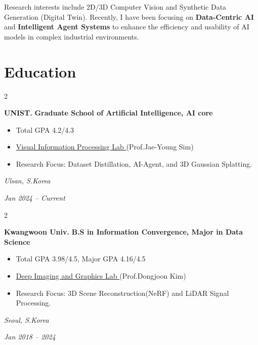 \documentclass[10pt, letterpaper]{article}
\newenvironment{highlights}{
    \begin{itemize}[
        topsep=0.10 cm,
        parsep=0.10 cm,
        partopsep=0pt,
        itemsep=0pt,
        leftmargin=0.4 cm + 10pt
    ]
}{
    \end{itemize}
} %
\newenvironment{twocolentry}[2][]{
    \onecolentry
    \def\secondColumn{#2}
    \setcolumnwidth{\fill, 3.5 cm}
    \begin{paracol}{2}
}{
    \switchcolumn \raggedleft \secondColumn
    \end{paracol}
    \endonecolentry
} %
\let\hrefWithoutArrow\href
\renewcommand{\href}[2]{\hrefWithoutArrow{#1}{\ifthenelse{\equal{#2}{}}{ }{#2 }\raisebox{.15ex}{\footnotesize \faExternalLink*}}}
\begin{document}
    Research interests include 2D/3D Computer Vision and Synthetic Data Generation (Digital Twin). Recently, I have been focusing on \textbf{Data-Centric AI} and \textbf{Intelligent Agent Systems} to enhance the efficiency and usability of AI models in complex industrial environments.
    
    \vspace{0.2cm}


    \section{Education}
        \begin{twocolentry}{
            \small\textit{Ulsan, S.Korea}
            
            \vspace{0.2cm}
            
            \textit{Jan 2024 – Current}
        }
            \textbf{\color{headingOrange}UNIST.}
            \textbf{Graduate School of Artificial Intelligence, AI core}
            \begin{highlights}
                \item Total GPA 4.2/4.3
                \item \hrefWithoutArrow{https://vip.unist.ac.kr/}{Visual Information Processing Lab \faLink}
                (Prof.Jae-Young Sim)
                \item Research Focus: Dataset Distillation, AI-Agent, and 3D Gaussian Splatting.
                \end{highlights}
        \end{twocolentry}


        \begin{twocolentry}{
            \small\textit{Seoul, S.Korea}
            
            \vspace{0.2cm}
            
            \textit{Jan 2018 – 2024}
        }
            \textbf{\color{headingOrange}Kwangwoon Univ.}
            \textbf{B.S in Information Convergence, Major in Data Science}
            \begin{highlights}
                \item Total GPA 3.98/4.5, Major GPA 4.16/4.5
                \item \hrefWithoutArrow{https://korfriend.github.io/}{Deep Imaging and Graphics Lab \faLink}(Prof.Dongjoon Kim)
                \item Research Focus: 3D Scene Reconstruction(NeRF) and LiDAR Signal Processing.
            \end{highlights}
        \end{twocolentry}
        
\end{document}
